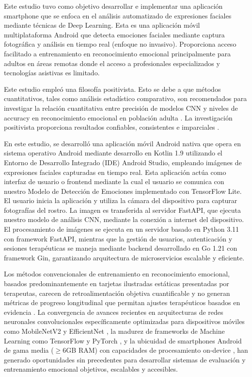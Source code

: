 \documentclass[journal,article,submit,pdftex,moreauthors]{Definitions/mdpi}
\begin{document}
	Este estudio tuvo como objetivo desarrollar e implementar una aplicación smartphone que se enfoca en el análisis automatizado de expresiones faciales mediante técnicas de Deep Learning. Esta es una aplicación móvil multiplataforma Android que detecta emociones faciales mediante captura fotográfica y análisis en tiempo real (enfoque no invasivo). Proporciona acceso facilitado a entrenamiento en reconocimiento emocional principalmente para adultos en áreas remotas donde el acceso a profesionales especializados y tecnologías asistivas es limitado.
	
	Este estudio empleó una filosofía positivista. Esto se debe a que métodos cuantitativos, tales como análisis estadístico comparativo, son recomendados para investigar la relación cuantitativa entre precisión de modelos CNN y niveles de accuracy en reconocimiento emocional en población adulta \cite{ref8,ref15}. La investigación positivista proporciona resultados confiables, consistentes e imparciales \cite{ref8}.
	
	En este estudio, se desarrolló una aplicación móvil Android nativa que opera en sistema operativo Android mediante desarrollo en Kotlin 1.9 utilizando el Entorno de Desarrollo Integrado (IDE) Android Studio, empleando imágenes de expresiones faciales capturadas en tiempo real. Esta aplicación actúa como interfaz de usuario o frontend mediante la cual el usuario se comunica con nuestro Modelo de Detección de Emociones implementado con TensorFlow Lite. El usuario inicia la aplicación y utiliza la cámara del dispositivo para capturar fotografías del rostro. La imagen es transferida al servidor FastAPI, que ejecuta nuestro modelo de análisis CNN, mediante la conexión a internet del dispositivo. El procesamiento de imágenes se ejecuta en un servidor basado en Python 3.11 con framework FastAPI, mientras que la gestión de usuarios, autenticación y sesiones terapéuticas se maneja mediante backend desarrollado en Go 1.21 con framework Gin, garantizando arquitectura de microservicios escalable y eficiente.
	
	Los métodos convencionales de entrenamiento en reconocimiento emocional, basados predominantemente en tarjetas ilustradas estáticas presentadas por terapeutas, carecen de retroalimentación objetiva cuantificable y no generan métricas de progreso longitudinal que permitan ajustes terapéuticos basados en evidencia \cite{ref10,ref14,ref24}. La convergencia de avances recientes en arquitecturas de redes neuronales convolucionales específicamente optimizadas para dispositivos móviles como MobileNetV2 y EfficientNet \cite{ref3,ref20,ref21}, la madurez de frameworks de Machine Learning como TensorFlow y PyTorch \cite{ref6,ref7}, y la ubicuidad de smartphones Android de gama media ($\geq$6GB RAM) con capacidades de procesamiento on-device \cite{ref2,ref5}, han generado oportunidades sin precedentes para desarrollar sistemas de evaluación y entrenamiento emocional objetivos, escalables y accesibles.
	
\end{document}
